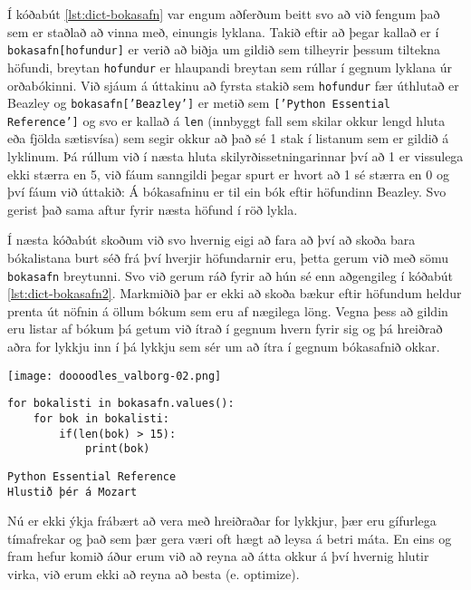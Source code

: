 Í kóðabút \ref{lst:dict-bokasafn} var engum aðferðum beitt svo að við fengum það sem er staðlað að vinna með, einungis lyklana.
Takið eftir að þegar kallað er í \texttt{bokasafn[hofundur]} er verið að biðja um gildið sem tilheyrir þessum tiltekna höfundi, breytan \texttt{hofundur} er hlaupandi breytan sem rúllar í gegnum lyklana úr orðabókinni.
Við sjáum á úttakinu að fyrsta stakið sem \texttt{hofundur} fær úthlutað er Beazley og \texttt{bokasafn['Beazley']} er metið sem \texttt{['Python Essential Reference']} og svo er kallað á \texttt{len} (innbyggt fall sem skilar okkur lengd hluta eða fjölda sætisvísa) sem segir okkur að það sé 1 stak í listanum sem er gildið á lyklinum.
Þá rúllum við í næsta hluta skilyrðissetningarinnar því að 1 er vissulega ekki stærra en 5, við fáum sanngildi þegar spurt er hvort að 1 sé stærra en 0 og því fáum við úttakið: Á bókasafninu er til ein bók eftir höfundinn Beazley.
Svo gerist það sama aftur fyrir næsta höfund í röð lykla.

Í næsta kóðabút skoðum við svo hvernig eigi að fara að því að skoða bara bókalistana burt séð frá því hverjir höfundarnir eru, þetta gerum við með sömu \texttt{bokasafn} breytunni.
Svo við gerum ráð fyrir að hún sé enn aðgengileg í kóðabút \ref{lst:dict-bokasafn2}.
Markmiðið þar er ekki að skoða bækur eftir höfundum heldur prenta út nöfnin á öllum bókum sem eru af nægilega löng.
Vegna þess að gildin eru listar af bókum þá getum við ítrað í gegnum hvern fyrir sig og þá hreiðrað aðra for lykkju inn í þá lykkju sem sér um að ítra í gegnum bókasafnið okkar.

	\begin{center}
		\texttt{[image: doooodles\_valborg-02.png]}
	\end{center}
		
\begin{lstlisting}[caption=Ítrun í gegnum orðabækur með .values(), label=lst:dict-bokasafn2]
for bokalisti in bokasafn.values():
	for bok in bokalisti:
		if(len(bok) > 15):
			print(bok)
\end{lstlisting}
\lstset{style=uttak}
\begin{lstlisting}
Python Essential Reference
Hlustið þér á Mozart
\end{lstlisting}
\lstset{style=venjulegt}

Nú er ekki ýkja frábært að vera með hreiðraðar for lykkjur, þær eru gífurlega tímafrekar og það sem þær gera væri oft hægt að leysa á betri máta.
En eins og fram hefur komið áður erum við að reyna að átta okkur á því hvernig hlutir virka, við erum ekki að reyna að besta (e. optimize).

